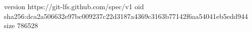 version https://git-lfs.github.com/spec/v1
oid sha256:dca2a506632e97bc009237c22d3187a4369c3163b77142f6aa54041eb5edd944
size 786528
